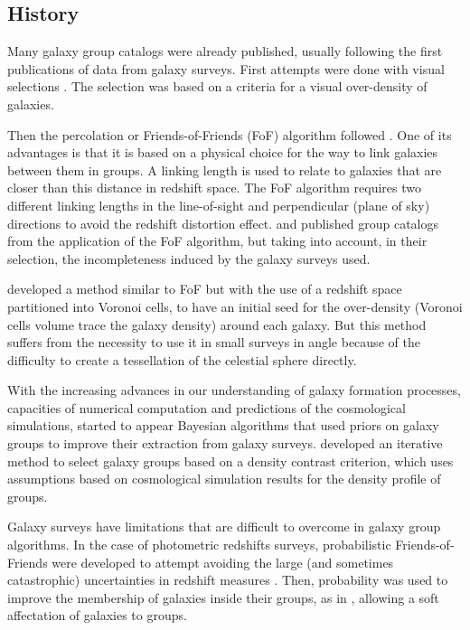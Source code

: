 \subsection{History}
\label{sub:history}

Many galaxy group catalogs were already published, usually following the first
publications of data from galaxy surveys. First attempts were done with visual
selections \citep{Abell+58,Zwicky+61,Rose+76}. The selection was based on a
criteria for a visual over-density of galaxies.

Then the percolation or Friends-of-Friends (FoF) algorithm followed
\citep{Huchra+82,NW87}. One of its advantages is that it is based on a physical
choice for the way to link galaxies between them in groups. A linking length is
used to relate to galaxies that are closer than this distance in redshift
space. The FoF algorithm requires two different linking lengths in the
line-of-sight and perpendicular (plane of sky) directions to avoid the redshift
distortion effect. \citet{Eke+04} and \citet{Berlind+06} published group
catalogs from the application of the FoF algorithm, but taking into account, in
their selection, the incompleteness induced by the galaxy surveys used.

\citet{Marinoni+02} developed a method similar to FoF but with the use of a
redshift space partitioned into Voronoi cells, to have an initial seed for the
over-density (Voronoi cells volume trace the galaxy density) around each
galaxy. But this method suffers from the necessity to use it in small surveys
in angle because of the difficulty to create a tessellation of the celestial
sphere directly.

With the increasing advances in our understanding of galaxy formation
processes, capacities of numerical computation and predictions of the
cosmological simulations, started to appear Bayesian algorithms that used
priors on galaxy groups to improve their extraction from galaxy surveys.
\citet{Yang+05,Yang+07} developed an iterative method to select galaxy groups
based on a density contrast criterion, which uses assumptions based on
cosmological simulation results for the density profile of groups.

Galaxy surveys have limitations that are difficult to overcome in galaxy group
algorithms. In the case of photometric redshifts surveys, probabilistic
Friends-of-Friends were developed to attempt avoiding the large (and sometimes
catastrophic) uncertainties in redshift measures \citep{Liu+08}. Then,
probability was used to improve the membership of galaxies inside their groups,
as in \citet{DominguezRomero+12}, allowing a soft affectation of galaxies to
groups.

